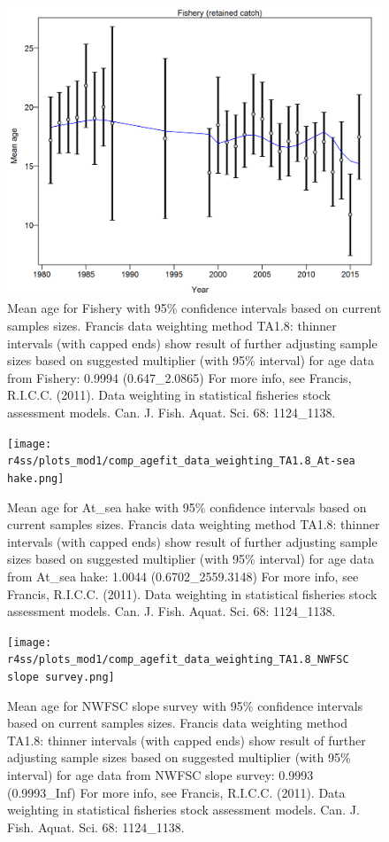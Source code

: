 \documentclass[12pt,]{article}
\begin{document}
\begin{figure}
\centering
\includegraphics{r4ss/plots_mod1/comp_agefit_data_weighting_TA1.8_Fishery.png}
\caption{Mean age for Fishery with 95\% confidence intervals based on
current samples sizes. Francis data weighting method TA1.8: thinner
intervals (with capped ends) show result of further adjusting sample
sizes based on suggested multiplier (with 95\% interval) for age data
from Fishery: 0.9994 (0.647\_2.0865) For more info, see Francis,
R.I.C.C. (2011). Data weighting in statistical fisheries stock
assessment models. Can. J. Fish. Aquat. Sci. 68: 1124\_1138.
\label{fig:weighting_fishery}}
\end{figure}

\begin{figure}
\centering
\texttt{[image: r4ss/plots\_mod1/comp\_agefit\_data\_weighting\_TA1.8\_At-sea hake.png]}
\caption{Mean age for At\_sea hake with 95\% confidence intervals based
on current samples sizes. Francis data weighting method TA1.8: thinner
intervals (with capped ends) show result of further adjusting sample
sizes based on suggested multiplier (with 95\% interval) for age data
from At\_sea hake: 1.0044 (0.6702\_2559.3148) For more info, see
Francis, R.I.C.C. (2011). Data weighting in statistical fisheries stock
assessment models. Can. J. Fish. Aquat. Sci. 68: 1124\_1138.
\label{fig:weighting_ashop}}
\end{figure}

\begin{figure}
\centering
\texttt{[image: r4ss/plots\_mod1/comp\_agefit\_data\_weighting\_TA1.8\_NWFSC slope survey.png]}
\caption{Mean age for NWFSC slope survey with 95\% confidence intervals
based on current samples sizes. Francis data weighting method TA1.8:
thinner intervals (with capped ends) show result of further adjusting
sample sizes based on suggested multiplier (with 95\% interval) for age
data from NWFSC slope survey: 0.9993 (0.9993\_Inf) For more info, see
Francis, R.I.C.C. (2011). Data weighting in statistical fisheries stock
assessment models. Can. J. Fish. Aquat. Sci. 68: 1124\_1138.
\label{fig:weighting_nwfscslope}}
\end{figure}
\end{document}
